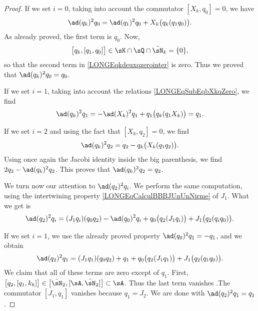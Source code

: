 \begin{proof}
	If we set $i=0$, taking into account the commutator $[X_k,q_0]=0$, we have
	\begin{equation}		\label{LONGEqkdeuxqzerointer}
		\ad(q_k)^2q_0=\ad(q_1)^2q_0+X_k\big( q_k(q_1q_0) \big).
	\end{equation}
	As already proved, the first term is $q_0$. Now,
	\begin{equation}
		\big[ q_k,[q_1,q_0] \big]\in\sK\cap\sQ\cap\tilde\sN_k=\{ 0 \},
	\end{equation}
	so that the second term in \eqref{LONGEqkdeuxqzerointer} is zero. Thus we proved that $\ad(q_k)^2q_0=q_0$.

	If we set $i=1$, taking into account the relations \eqref{LONGEqSubEqbXkqZero}, we find
	\begin{equation}
		\ad(q_k)^2q_1=-\ad(X_k)^2q_1+q_1\big( q_k(q_1X_k) \big)=q_1.
	\end{equation}

	If we set $i=2$ and using the fact that $[X_k,q_2]=0$, we find
	\begin{equation}
		\ad(q_k)^2q_2=q_2-q_k\big( X_k(q_1q_2) \big).
	\end{equation}
	Using once again the Jacobi identity inside the big parenthesis, we find $2q_2-\ad(q_k)^2q_2$. This proves that $\ad(q_k)^2q_2=q_2$.


	We turn now our attention to $\ad(q_2)^2q_i$. We perform the same computation, using the intertwining property \eqref{LONGEqCalculBBBJUnUnNirme} of $J_1$. What we get is
	\begin{equation}		\label{LONGEqadqqqDeuxIGene}
		\ad(q_2)^2q_i=(J_1q_i)(q_0q_2)-\ad(q_0)^2q_i+q_0\big( q_2(J_1q_i) \big)+J_1\big( q_2(q_iq_0) \big).
	\end{equation}

	If we set $i=1$, we use the already proved property $\ad(q_0)^2q_1=-q_1$, and we obtain
	\begin{equation}
		\ad(q_2)^2q_1=(J_1q_1)(q_0q_2)+q_1+q_0\big( q_2(J_1q_1) \big)+J_1\big( q_2(q_1q_0) \big).
	\end{equation}
	We claim that all of these terms are zero except of $q_1$. First, $\big[ q_2,[q_1,k_k] \big]\in\big[ \tilde\sN_2,[\sA,\tilde\sN_2] \big]\subset\sA$.	Thus the last term vanishes .The commutator $[J_1,q_1]$ vanishes because $q_1=J_2$. We are done with $\ad(q_2)^2q_1=q_1$.


\end{proof}
